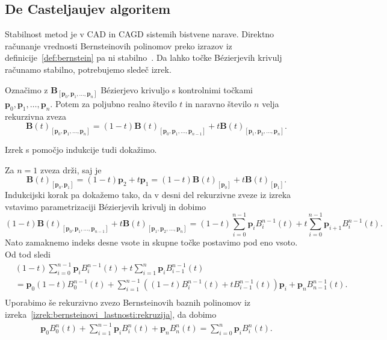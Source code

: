 \documentclass[isrm2, tisk]{fmfdelo}
\newcommand{\p}{\mathbf{p}}
\newcommand{\lilb}[2]{B_{#1}^{#2}(t)}
\newcommand{\bigbbt}{\textbf{B}(t)}
\newcommand{\bernsteinsump}[2]{\sum_{#1=0}^{#2} \p_{#1}\lilb{#1}{#2}}
\begin{document}
    \subsection{De Casteljaujev algoritem}
    Stabilnost metod je v CAD in CAGD sistemih bistvene narave.
    Direktno računanje vrednosti Bernsteinovih polinomov preko izrazov iz definicije~\ref{def:bernstein} pa ni stabilno~\cite{stability}.
    Da lahko točke Bézierjevih krivulj računamo stabilno, potrebujemo sledeč izrek.
    \begin{izrek}
        \label{izrek:decastelaju-rekurzija}
        Označimo z $\mathbf{B}_{[\p_0,\p_1,\dots,\p_n]}$ Bézierjevo krivuljo s kontrolnimi točkami \\
        $\p_0,\p_1,\dots,\p_n$.
        Potem za poljubno realno število $t$ in naravno število $n$ velja rekurzivna zveza \[\bigbbt_{[\p_0,\p_1,\dots,\p_n]} = (1-t)\bigbbt_{[\p_0,\p_1,\dots,\p_{n-1}]} +t\bigbbt_{[\p_1,\p_2,\dots,\p_n]}.\]
    \end{izrek}
    \noindent Izrek s pomočjo indukcije tudi dokažimo.
    \begin{dokaz}
        Za $n=1$ zveza drži, saj je  \[\bigbbt_{[\p_0,\p_1]} = (1-t)\p_2 +t\p_1 = (1-t)\bigbbt_{[\p_0]} +t\bigbbt_{[\p_1]}.\]
        Indukcijski korak pa dokažemo tako, da v desni del rekurzivne zveze iz izreka vstavimo parametrizaciji Bézierjevih krivulj in dobimo
        \[ (1-t) \bigbbt_{[\p_0,\p_1,\dots,\p_{n-1}]}+t\bigbbt_{[\p_1,\p_2,\dots,\p_n]} = (1-t)\bernsteinsump{i}{n-1}+t\sum_{i=0}^{n-1} \p_{i+1}B_i^{n-1}(t).\]
        Nato zamaknemo indeks desne vsote in skupne točke postavimo pod eno vsoto.
        Od tod sledi
        \begin{align*}
            &(1-t)\bernsteinsump{i}{n-1}+ t\sum_{i=1}^{n} \p_{i}B_{i-1}^{n-1}(t) \\
            &= \p_0(1-t)B_{0}^{n-1}(t) + \sum_{i=1}^{n-1}\left((1-t)B_i^{n-1}(t) + tB_{i-1}^{n-1}(t)\right)\p_{i} + \p_n B_{n-1}^{n-1}(t). \\
        \end{align*}
        Uporabimo še rekurzivno zvezo Bernsteinovih baznih polinomov iz izreka~\ref{izrek:bernsteinovi_lastnosti:rekruzija}, da dobimo
        \begin{align*}
            \p_0B_{0}^{n}(t) + \sum_{i=1}^{n-1}\p_{i}B_i^n(t) + \p_n B_{n}^{n}(t) = \sum_{i=0}^{n}\p_{i}B_i^n(t).
        \end{align*}
    \end{dokaz}
\end{document}
